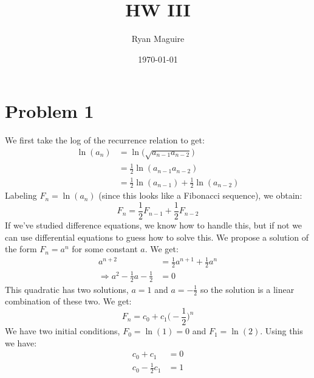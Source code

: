 \documentclass{article}
\title{HW III}
\author{Ryan Maguire}
\date{\today}
\begin{document}
    \maketitle
    \section*{Problem 1}
        We first take the log of the recurrence relation to
        get:
        \begin{subequations}
            \begin{align}
                \ln(a_{n})&=\ln\big(\sqrt{a_{n-1}a_{n-2}}\big)\\
                    &=\frac{1}{2}\ln(a_{n-1}a_{n-2})\\
                    &=\frac{1}{2}\ln(a_{n-1})+
                        \frac{1}{2}\ln(a_{n-2})
            \end{align}
        \end{subequations}
        Labeling $F_{n}=\ln(a_{n})$ (since this looks like a
        Fibonacci sequence), we obtain:
        \begin{equation}
            F_{n}=\frac{1}{2}F_{n-1}+\frac{1}{2}F_{n-2}
        \end{equation}
        If we've studied difference equations, we know how to
        handle this, but if not we can use differential equations
        to guess how to solve this. We propose a solution of the
        form $F_{n}=a^{n}$ for some constant $a$. We get:
        \begin{subequations}
            \begin{align}
                a^{n+2}&=\frac{1}{2}a^{n+1}+\frac{1}{2}a^{n}\\
                \Rightarrow
                a^{2}-\frac{1}{2}a-\frac{1}{2}&=0
            \end{align}
        \end{subequations}
        This quadratic has two solutions, $a=1$ and
        $a=-\frac{1}{2}$ so the solution is a linear combination
        of these two. We get:
        \begin{equation}
            F_{n}=c_{0}+c_{1}\big(-\frac{1}{2}\big)^{n}
        \end{equation}
        We have two initial conditions, $F_{0}=\ln(1)=0$ and
        $F_{1}=\ln(2)$. Using this we have:
        \begin{subequations}
            \begin{align}
                c_{0}+c_{1}&=0\\
                c_{0}-\frac{1}{2}c_{1}&=1
            \end{align}
        \end{subequations}
\end{document}
